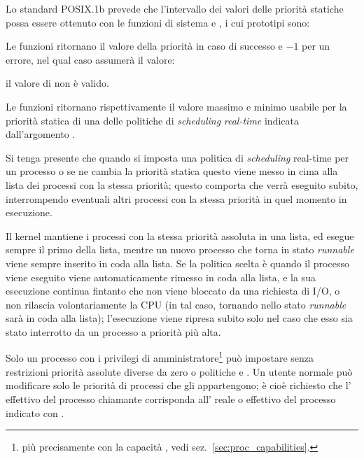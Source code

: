 Lo standard POSIX.1b prevede che l'intervallo dei valori delle priorità
statiche possa essere ottenuto con le funzioni di sistema
 e , i cui
prototipi sono:

\begin{funcproto}{ 
}
{Le funzioni ritornano il valore della priorità in caso di successo e $-1$ per
  un errore, nel qual caso  assumerà il valore:
\begin{errlist}
\item[\errcode{EINVAL}] il valore di  non è valido.
\end{errlist}}
\end{funcproto}

Le funzioni ritornano rispettivamente il valore massimo e minimo usabile per
la priorità statica di una delle politiche di \textit{scheduling}
\textit{real-time} indicata dall'argomento .

Si tenga presente che quando si imposta una politica di \textit{scheduling}
real-time per un processo o se ne cambia la priorità statica questo viene
messo in cima alla lista dei processi con la stessa priorità; questo comporta
che verrà eseguito subito, interrompendo eventuali altri processi con la
stessa priorità in quel momento in esecuzione.

Il kernel mantiene i processi con la stessa priorità assoluta in una lista, ed
esegue sempre il primo della lista, mentre un nuovo processo che torna in
stato \textit{runnable} viene sempre inserito in coda alla lista. Se la
politica scelta è  quando il processo viene eseguito viene
automaticamente rimesso in coda alla lista, e la sua esecuzione continua
fintanto che non viene bloccato da una richiesta di I/O, o non rilascia
volontariamente la CPU (in tal caso, tornando nello stato \textit{runnable}
sarà in coda alla lista); l'esecuzione viene ripresa subito solo nel caso che
esso sia stato interrotto da un processo a priorità più alta.

Solo un processo con i privilegi di amministratore\footnote{più precisamente
  con la capacità , vedi
  sez.~\ref{sec:proc_capabilities}.} può impostare senza restrizioni priorità
assolute diverse da zero o politiche  e
. Un utente normale può modificare solo le priorità di
processi che gli appartengono; è cioè richiesto che l' effettivo del
processo chiamante corrisponda all' reale o effettivo del processo
indicato con .

